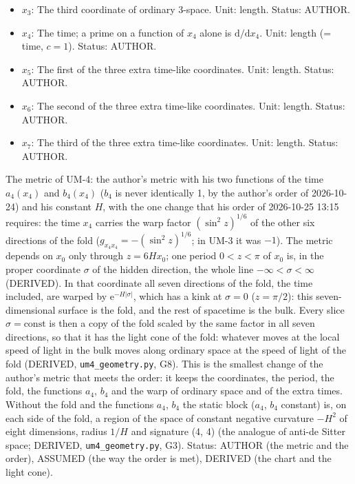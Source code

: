 \documentclass[
  10pt,
]{article}
\begin{document}
\begin{itemize}
  Status: AUTHOR.
\item
  \(x_3\): The third coordinate of ordinary 3-space. Unit: length.
  Status: AUTHOR.
\item
  \(x_4\): The time; a prime on a function of \(x_4\) alone is
  \(\mathrm{d}/\mathrm{d}x_4\). Unit: length (= time, \(c = 1\)).
  Status: AUTHOR.
\item
  \(x_5\): The first of the three extra time-like coordinates. Unit:
  length. Status: AUTHOR.
\item
  \(x_6\): The second of the three extra time-like coordinates. Unit:
  length. Status: AUTHOR.
\item
  \(x_7\): The third of the three extra time-like coordinates. Unit:
  length. Status: AUTHOR.
\end{itemize}

The metric of UM-4: the author's metric with his two functions of the
time \(a_4(x_4)\) and \(b_4(x_4)\) (\(b_4\) is never identically 1, by
the author's order of 2026-10-24) and his constant \(H\), with the one
change that his order of 2026-10-25 13:15 requires: the time \(x_4\)
carries the warp factor \((\sin^2z)^{1/6}\) of the other six directions
of the fold (\(g_{x_4x_4} = -(\sin^2z)^{1/6}\); in UM-3 it was \(-1\)).
The metric depends on \(x_0\) only through \(z = 6Hx_0\); one period
\(0 < z < \pi\) of \(x_0\) is, in the proper coordinate \(\sigma\) of
the hidden direction, the whole line \(-\infty < \sigma < \infty\)
(DERIVED). In that coordinate all seven directions of the fold, the time
included, are warped by \(\mathrm{e}^{-H\lvert\sigma\rvert}\), which has
a kink at \(\sigma = 0\) (\(z = \pi/2\)): this seven-dimensional surface
is the fold, and the rest of spacetime is the bulk. Every slice
\(\sigma = \text{const}\) is then a copy of the fold scaled by the same
factor in all seven directions, so that it has the light cone of the
fold: whatever moves at the local speed of light in the bulk moves along
ordinary space at the speed of light of the fold (DERIVED,
\texttt{um4\_geometry.py}, G8). This is the smallest change of the
author's metric that meets the order: it keeps the coordinates, the
period, the fold, the functions \(a_4\), \(b_4\) and the warp of
ordinary space and of the extra times. Without the fold and the
functions \(a_4\), \(b_4\) the static block (\(a_4\), \(b_4\) constant)
is, on each side of the fold, a region of the space of constant negative
curvature \(-H^2\) of eight dimensions, radius \(1/H\) and signature (4,
4) (the analogue of anti-de Sitter space; DERIVED,
\texttt{um4\_geometry.py}, G3). Status: AUTHOR (the metric and the
order), ASSUMED (the way the order is met), DERIVED (the chart and the
light cone).
\end{document}
